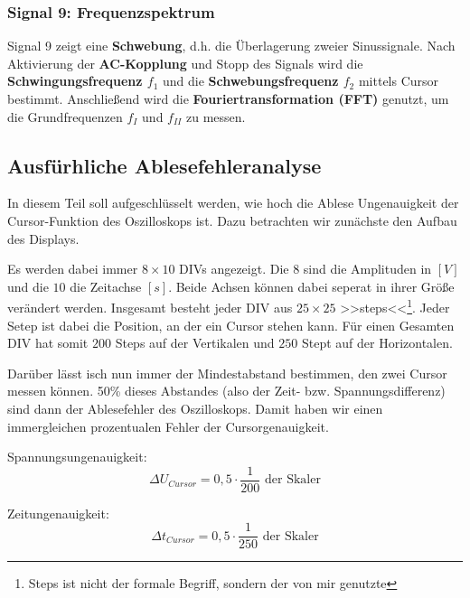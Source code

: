 \subsubsection{Signal 9: Frequenzspektrum}
Signal 9 zeigt eine \textbf{Schwebung}, d.h. die Überlagerung zweier Sinussignale. Nach Aktivierung der \textbf{AC-Kopplung} und Stopp des Signals wird die \textbf{Schwingungsfrequenz $f_1$} und die \textbf{Schwebungsfrequenz $f_2$} mittels Cursor bestimmt. Anschließend wird die \textbf{Fouriertransformation (FFT)} genutzt, um die Grundfrequenzen $f_I$ und $f_{II}$ zu messen.

\subsection*{Ausfürhliche Ablesefehleranalyse}
In diesem Teil soll aufgeschlüsselt werden, wie hoch die Ablese Ungenauigkeit der Cursor-Funktion des Oszilloskops ist. 
Dazu betrachten wir zunächste den Aufbau des Displays. 


Es werden dabei immer $8 \times 10$ DIVs angezeigt. Die $8$ sind die Amplituden in $[V]$ und die $10$ die Zeitachse $[s]$. Beide Achsen können dabei seperat in ihrer Größe verändert werden.
Insgesamt besteht jeder DIV aus $25 \times 25$ >>steps<<\footnote{Steps ist nicht der formale Begriff, sondern der von mir genutzte}. Jeder Setep ist dabei die Position, an der ein Cursor stehen kann. 
Für einen Gesamten DIV hat somit $200$ Steps auf der Vertikalen und $250$ Stept auf der Horizontalen. 

Darüber lässt isch nun immer der Mindestabstand bestimmen, den zwei Cursor messen können. 50\% dieses Abstandes (also der Zeit- bzw. Spannungsdifferenz) sind dann der Ablesefehler des Oszilloskops.
Damit haben wir einen immergleichen prozentualen Fehler der Cursorgenauigkeit. 

Spannungsungenauigkeit:
\begin{equation}
    \Delta U_{Cursor} = 0,5 \cdot \frac{1}{200} \text{ der Skaler}
\end{equation}

Zeitungenauigkeit:
\begin{equation}
    \Delta t_{Cursor} = 0,5 \cdot \frac{1}{250} \text{ der Skaler}
\end{equation}


